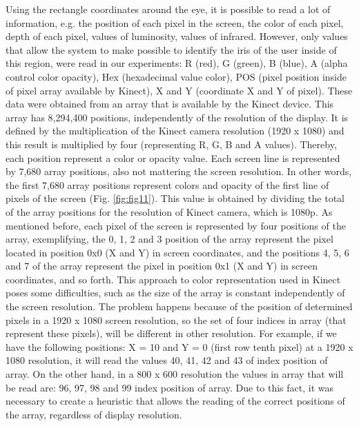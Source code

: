 \documentclass[10pt, conference]{IEEEtran}
\begin{document}
	Using the rectangle coordinates around the eye, it is possible to read a lot of information, e.g. the position of each pixel in the screen, the color of each pixel, depth of each pixel, values of luminosity, values of infrared. 
	However, only values that allow the system to make possible to identify the iris of the user inside of this region, were read in our experiments: R (red), G (green), B (blue), A (alpha control color opacity), Hex (hexadecimal value color), POS (pixel position inside of pixel array available by Kinect), X and Y (coordinate X and Y of pixel).
	These data were obtained from an array that is available by the Kinect device. 
    This array has 8,294,400 positions, independently of the resolution of the display. 
	It is defined by the multiplication of the Kinect camera resolution (1920 x 1080) and this result is multiplied by four (representing R, G, B and A values). 
	Thereby, each position represent a color or opacity value. 
    Each screen line is represented by 7,680 array positions, also not mattering the screen resolution. 
    In other words, the first 7,680 array positions represent colors and opacity of the first line of pixels of the screen (Fig. \ref{fig:fig11}). 
	This value is obtained by dividing the total of the array positions for the resolution of Kinect camera, which is 1080p. 
	As mentioned before, each pixel of the screen is represented by four positions of the array, exemplifying, the 0, 1, 2 and 3 position of the array represent the pixel located in position 0x0 (X and Y) in screen coordinates, and the positions 4, 5, 6 and 7 of the array represent the pixel in position 0x1 (X and Y) in screen coordinates, and so forth.
	This approach to color representation used in Kinect poses some difficulties, such as the size of the array is constant independently of the screen resolution. 
	The problem happens because of the position of determined pixels in a 1920 x 1080 screen resolution, so the set of four indices in array (that represent these pixels), will be different in other resolution. 
	For example, if we have the following positions: X = 10 and Y = 0 (first row tenth pixel) at a 1920 x 1080 resolution, it will read the values 40, 41, 42 and 43 of index position of array. 
    On the other hand, in a 800 x 600 resolution the values in array that will be read are: 96, 97, 98 and 99 index position of array. 
	Due to this fact, it was necessary to create a heuristic that allows the reading of the correct positions of the array, regardless of display resolution.
\end{document}
